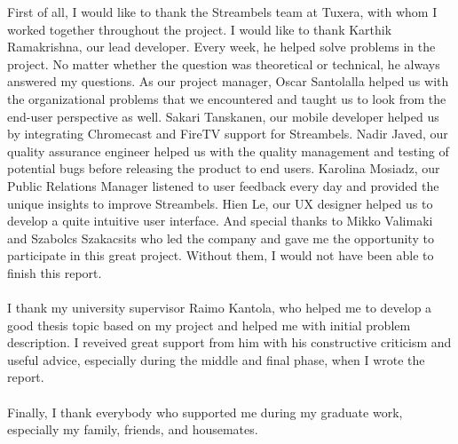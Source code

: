 
First of all, I would like to thank the Streambels team at Tuxera, with whom I worked
together throughout the project. I would like to thank Karthik Ramakrishna, our
lead developer. Every week, he helped solve problems in the project.
No matter whether the question was theoretical or technical, he always answered my
questions. As our project manager, Oscar Santolalla helped us with
the organizational problems that we encountered and taught us to look from the
end-user perspective as well. Sakari Tanskanen, our mobile developer helped us
by integrating Chromecast and FireTV support for Streambels. Nadir Javed, our
quality assurance engineer helped us with the quality management and testing of
potential bugs before releasing the product to end users. Karolina Mosiadz, our
Public Relations Manager listened to user feedback every day and provided the unique
insights to improve Streambels. Hien Le, our UX designer helped us to develop
a quite intuitive user interface. And special thanks to Mikko Valimaki and Szabolcs
Szakacsits who led the company and gave me the opportunity to participate in
this great project. Without them, I would not have been able to finish this
report.\\
\\
I thank my university supervisor Raimo Kantola, who helped me to develop a good
thesis topic based on my project and helped me with initial problem description.
I reveived great support from him with his constructive criticism and useful advice, especially
during the middle and final phase, when I wrote the report.\\
\\
Finally, I thank everybody who supported me during my graduate work,
especially my family, friends, and housemates.